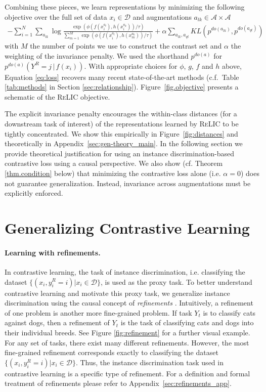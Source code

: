 \documentclass{article}
\newcommand{\feat}{f}
\newcommand{\target}{h}
\newcommand{\relic}{\textsc{ReLIC}}
\begin{document}
Combining these pieces, we learn representations by minimizing the following objective over the full set of data $x_{i}\in\mathcal{D}$ and augmentations $a_{lk}\in\mathcal{A}\times\mathcal{A}$
\begin{align}
   -\sum_{i=1}^{N}\sum_{a_{lk}} \log \frac{
    \exp\left(\phi(\feat(x_i^{a_l}), \target(x_i^{a_k}))/ \tau \right)
    }
    {
    \sum_{m=1}^M \exp\left( \phi(\feat(x_i^{a_l}), \target(x_m^{a_k}) ) / \tau\right) 
    } 
    + \alpha\sum_{a_{lk}, a_{qt}} KL(p^{do(a_{lk})}, p^{do(a_{qt})})
    \label{eq:loss}
\end{align}
with $M$ the number of points we use to construct the contrast set and $\alpha$ the weighting of the invariance penalty.
We used the shorthand $p^{do(a)}$ for $p^{do(a)}(Y^{R} = j \,\vert \, \feat(x_{i}))$.
With appropriate choices for $\phi$, $g$, $f$ and $h$ above, Equation \ref{eq:loss} recovers many recent state-of-the-art methods (c.f.\ Table \ref{tab:methods} in Section \ref{sec:relationship}). Figure~\ref{fig.objective} presents a schematic of the \relic{} objective. 

The explicit invariance penalty encourages the within-class distances (for a downstream task of interest) of the representations learned by \relic{} to be tightly concentrated. We show this empirically in Figure~\ref{fig:distances} and theoretically in Appendix~\ref{sec:gen-theory_main}. 
In the following section we provide theoretical justification for using an instance discrimination-based contrastive loss using a causal perspective. 
We also show (cf. Theorem \ref{thm.condition} below) that minimizing the contrastive loss alone (i.e. $\alpha=0$) does not guarantee generalization.
Instead, invariance across augmentations must be explicitly enforced. 
 \section{Generalizing Contrastive Learning}
\label{sec:method}

\paragraph{Learning with refinements.} \label{sec:refinements}
In contrastive learning, the task of instance discrimination, i.e. classifying the dataset $\{(x_i, y_i^{R} = i) \vert x_{i}\in \mathcal{D}\}$, is used as the proxy task.
To better understand contrastive learning and motivate this proxy task, we generalize instance discrimination using the causal concept of \emph{refinements} \citep{chalupka2014visual}.
Intuitively, a refinement of one problem is another more fine-grained problem.
If task $Y_{t}$ is to classify cats against dogs, then a refinement of $Y_{t}$ is the task of classifying cats and dogs into their individual breeds.
See Figure \ref{fig:refinement} for a further visual example. 
 For any set of tasks, there exist many different refinements. 
However, the most fine-grained refinement corresponds exactly to classifying the dataset $\{(x_i, y_i^{R} = i) \vert x_{i}\in \mathcal{D}\}$.
Thus, the instance discrimination task used in contrastive learning is a specific type of refinement.
For a definition and formal treatment of refinements please refer to Appendix~\ref{sec:refinements_app}.
\end{document}
